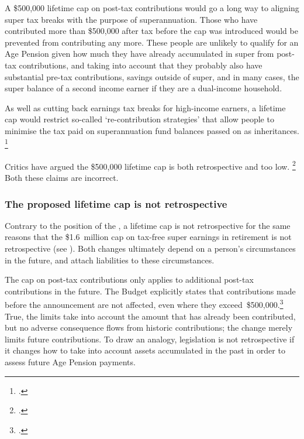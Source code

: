\documentclass[continuous]{grattan}\usepackage[]{graphicx}\usepackage[]{color}
\begin{document}
A \$500,000 lifetime cap on post-tax contributions would go a long way to aligning super tax breaks with the purpose of superannuation. 
Those who have contributed more than \$500,000 after tax before the cap was introduced would be prevented from contributing any more. 
These people are unlikely to qualify for an Age Pension given how much they have already accumulated in super from post-tax contributions, and taking into account that they probably also have substantial pre-tax contributions, savings outside of super, and in many cases, the super balance of a second income earner if they are a dual-income household.

As well as cutting back earnings tax breaks for high-income earners, a lifetime cap would restrict so-called `re-contribution strategies' that allow people to minimise the tax paid on superannuation fund balances passed on as inheritances.%
\footcite[][54--55]{DaleyCoatesWoodEtAl2015Super}

Critics have argued the \$500,000 lifetime cap is both retrospective and too low.%
\footcites{Chartered-accountants-on-2016-Govts-budget-super-changes}{McCrann-scott-morrison-super-changes-big-positive-deal} %
Both these claims are incorrect. \enlargethispage{-0.25\baselineskip}

\subsubsection{The proposed lifetime cap is not retrospective}
Contrary to the position of the \ALP{}, a lifetime cap is not retrospective for the same reasons that the \$1.6~million cap on tax-free super earnings in retirement is not retrospective (see ). 
Both changes ultimately depend on a person’s circumstances in the future, and attach liabilities to these circumstances. 

The cap on post-tax contributions only applies to additional post-tax contributions in the future. 
The Budget explicitly states that contributions made before the announcement are not affected, even where they exceed~\$500,000.\footcites{BudgetPapers201617}{Stewart-Ingles-2016-debate-are-super-changes-retrospective} %
True, the limits take into account the amount that has already been contributed, but no adverse consequence flows from historic contributions; the change merely limits future contributions. 
To draw an analogy, legislation is not retrospective if it changes how to take into account assets accumulated in the past in order to assess future Age Pension payments. 
\end{document}
